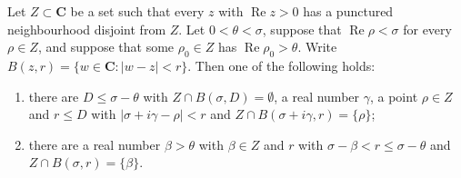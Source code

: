 \begin{lemma}\label{wl-nearest-pole}
Let $Z\subset\mathbf C$ be a set such that every $z$ with
$\operatorname{Re}z>0$ has a punctured neighbourhood disjoint from $Z$. Let
$0<\theta<\sigma$, suppose that $\operatorname{Re}\rho<\sigma$ for every
$\rho\in Z$, and suppose that some $\rho_0\in Z$ has
$\operatorname{Re}\rho_0>\theta$. Write $B(z,r)=\{w\in\mathbf C:|w-z|<r\}$.
Then one of the following holds:
\begin{enumerate}
\item there are $D\leq\sigma-\theta$ with $Z\cap B(\sigma,D)=\emptyset$, a
  real number $\gamma$, a point $\rho\in Z$ and $r\leq D$ with
  $|\sigma+i\gamma-\rho|<r$ and $Z\cap B(\sigma+i\gamma,r)=\{\rho\}$;
\item there are a real number $\beta>\theta$ with $\beta\in Z$ and $r$ with
  $\sigma-\beta<r\leq\sigma-\theta$ and $Z\cap B(\sigma,r)=\{\beta\}$.
\end{enumerate}
\end{lemma}
